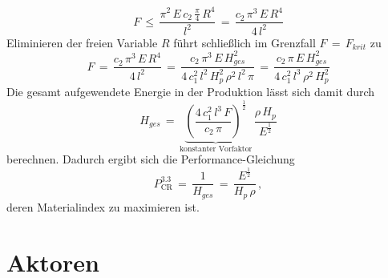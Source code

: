 \begin{equation}
F\,\le\,\frac{\pi^2\,E\,c_2\,\frac{\pi}{4}\,R^4}{l^2}\,=\,\frac{c_2\,\pi^3\,E\,R^4}{4\,l^2}
\end{equation}
Eliminieren der freien Variable $R$ führt schließlich im Grenzfall $F\,=\,F_{krit}$ zu
\begin{equation}
F\,=\,\frac{c_2\,\pi^3\,E\,R^4}{4\,l^2}\,=\,\frac{c_2\,\pi^3\,E\,H_{ges}^2}{4\,c_1^2\,l^2\,H_p^2\,\rho^2\,l^2\,\pi}\,=\,\frac{c_2\,\pi\,E\,H_{ges}^2}{4\,c_1^2\,l^3\,\rho^2\,H_p^2}
\end{equation}
Die gesamt aufgewendete Energie in der Produktion lässt sich damit durch
\begin{equation}
H_{ges}\,=\,\underbrace{\left(\frac{4\,c_1^2\,l^3\,F}{c_2\,\pi}\right)^\frac{1}{2}}_{\text{konstanter Vorfaktor}}\,\frac{\rho\,H_p}{E^\frac{1}{2}}
\end{equation}
berechnen.
Dadurch ergibt sich die Performance-Gleichung
\begin{equation} \label{zielfkt3}
P_{\text{CR}}^{3.3}\,=\,\frac{1}{H_{ges}}\,=\,\frac{E^\frac{1}{2}}{H_p\,\rho}\,,
\end{equation}
deren Materialindex zu maximieren ist.

\section{Aktoren}